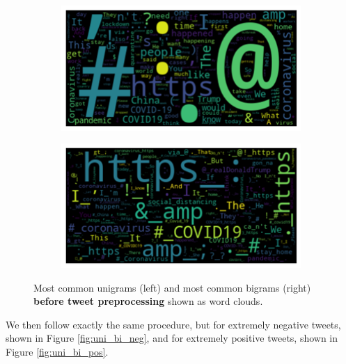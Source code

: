 \begin{figure}
    \centering
    \begin{subfigure}{0.49\columnwidth}
        \includegraphics[width=1\textwidth]{images/uni_bef.png}
    \end{subfigure}
    \centering
    \begin{subfigure}{0.49\columnwidth}
        \includegraphics[width=1\textwidth]{images/bi_bef.png}
    \end{subfigure}
    \caption{Most common unigrams (left) and most common bigrams (right) \textbf{before tweet preprocessing} shown as word clouds.}
    \label{fig:uni_bi_bef}
\end{figure}

We then follow exactly the same procedure, but for extremely negative tweets, shown in Figure \ref{fig:uni_bi_neg}, and for extremely positive tweets, shown in Figure \ref{fig:uni_bi_pos}.

